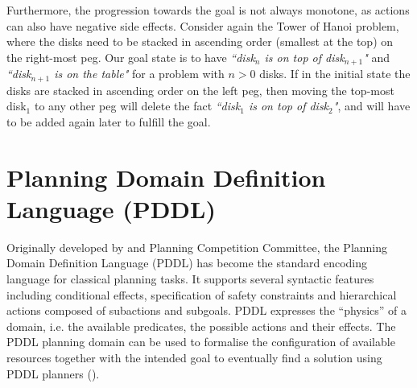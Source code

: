 Furthermore, the progression towards the goal is not always monotone, as actions can also have negative side effects. Consider again the Tower of Hanoi problem, where the disks need to be stacked in ascending order (smallest at the top) on the right-most peg. Our goal state is to have \textit{``disk$_{n}$ is on top of disk$_{n+1}$"} and \textit{``disk$_{n+1}$ is on the table"} for a problem with $n>0$ disks. If in the initial state the disks are stacked in ascending order on the left peg, then moving the top-most disk$_1$ to any other peg will delete the fact \textit{``disk$_1$ is on top of disk$_2$"}, and will have to be added again later to fulfill the goal.




\section{Planning Domain Definition Language (PDDL)}\label{subsec:PDDL}
Originally developed by \cite{mcdermott1998pddl} and Planning Competition Committee, the Planning Domain Definition Language (PDDL) has become the standard encoding language for classical planning tasks. It supports several syntactic features including conditional effects, specification of safety constraints and hierarchical actions composed of subactions and subgoals. PDDL expresses the ``physics'' of a domain, i.e. the available predicates, the possible actions and their effects.
The PDDL planning domain can be used to formalise the configuration of available resources together with the intended goal to eventually find a solution using PDDL planners  (\cite{huckaby2013planning}). 
%

